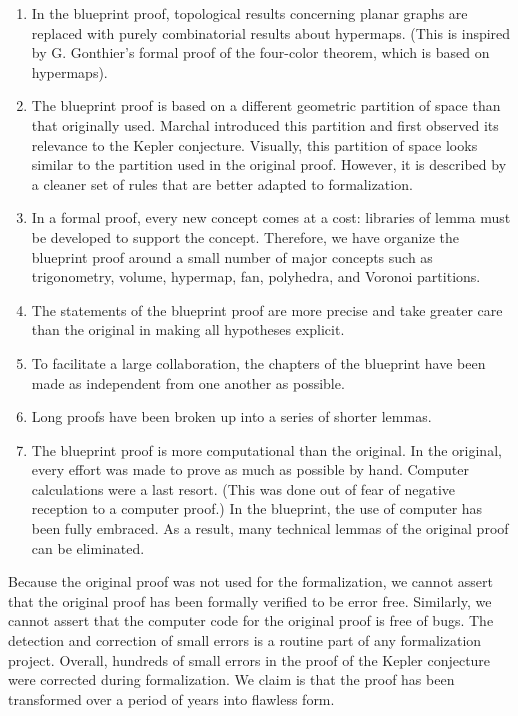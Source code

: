 \begin{enumerate}
\item In the blueprint proof, topological results concerning planar
  graphs are replaced with purely combinatorial results about
  hypermaps.  (This is inspired by G. Gonthier's formal proof of the
  four-color theorem, which is based on hypermaps).
\item The blueprint proof is based on a different geometric partition
  of space than that originally used.  Marchal introduced this
  partition and first observed its relevance to the Kepler conjecture.
  Visually, this partition of space looks similar to the partition
  used in the original proof.  However, it is described by a cleaner
  set of rules that are better adapted to formalization.
\item In a formal proof, every new concept comes at a cost: libraries
  of lemma must be developed to support the concept.  Therefore, we
  have organize the blueprint proof around a small number of major
  concepts such as trigonometry, volume, hypermap, fan, polyhedra, and
  Voronoi partitions.
\item The statements of the blueprint proof are more precise and take
  greater care than the original in making all hypotheses explicit.
\item To facilitate a large collaboration, the chapters of the blueprint have been made as
independent from one another as possible.
\item Long proofs have been broken up into a series of shorter lemmas.
\item The blueprint proof is more computational than the original.  In
  the original, every effort was made to prove as much as possible by
  hand.  Computer calculations were a last resort.  (This was done out
  of fear of negative reception to a computer proof.)  In the
  blueprint, the use of computer has been fully embraced.  As a
  result, many technical lemmas of the original proof can be
  eliminated.
\end{enumerate}


Because the original proof was not used for the formalization, we
cannot assert that the original proof has been formally verified to be
error free.  Similarly, we cannot assert that the computer code for
the original proof is free of bugs.  The detection and correction of
small errors is a routine part of any formalization project.  Overall,
hundreds of small errors in the proof of the Kepler conjecture were
corrected during formalization.  We claim is that the proof has been
transformed over a period of years into flawless form.

